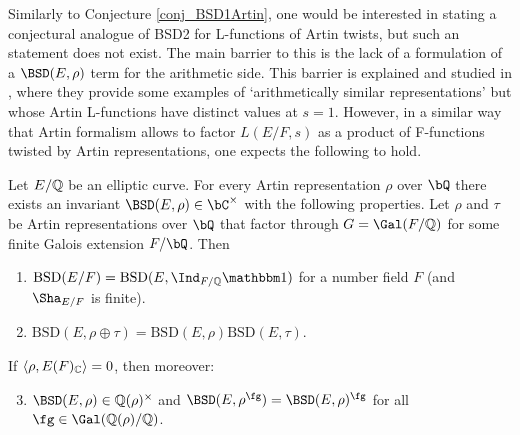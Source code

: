 Similarly to Conjecture \ref{conj_BSD1Artin}, one would be interested in stating a conjectural analogue of BSD2 for L-functions of Artin twists, but such an statement does not exist. The main barrier to this is the lack of a formulation of a $\BSD(E,\rho)$ term for the arithmetic side. This barrier is explained and studied in \cite[\S4]{DEW1}, where they provide some examples of `arithmetically similar representations' but whose Artin L-functions have distinct values at $s=1$. However, in a similar way that Artin formalism allows to factor $L(E/F,s)$ as a product of F-functions twisted by Artin representations, one expects the following to hold.

\begin{conj}{\cite[Conjecture 4]{DEW1}}
    Let $E/\mathbb{Q}$ be an elliptic curve. 
    For every Artin representation $\rho$ over $\bQ$ there exists an invariant $\BSD(E, \rho) \in \bC^{\times}$ with the following properties. 
    Let $\rho$ and $\tau$ be Artin representations over $\bQ$ that factor through $G = \Gal(F/\QQ)$ for some finite Galois extension $F / \bQ$. Then 
    \begin{enumerate}[label={\bfseries C\arabic*.}]
        \setlength\itemsep{0em}
        \item $\mathrm{BSD}(E/F)=\mathrm{BSD}(E,\Ind_{F/\QQ}\trivial)$ for a number field $F$ (and $\Sha_{E/F}$ is finite).
        \item $\mathrm{BSD}(E,\rho\oplus\tau)=\mathrm{BSD}(E,\rho)\mathrm{BSD}(E,\tau)$.
    \end{enumerate}       
        If $\langle\rho,E(F)_{\mathbb{C}}\rangle=0$, then moreover:
    \begin{enumerate}[label={\bfseries C\arabic*.}]
        \setcounter{enumi}{2}
       \item $\BSD(E,\rho)\in\QQ(\rho)^{\times}$ and $\BSD(E,\rho^{\fg})=\BSD(E,\rho)^{\fg}$ for all $\fg\in\Gal(\QQ(\rho)/\QQ)$.%
    \end{enumerate}
\end{conj}

